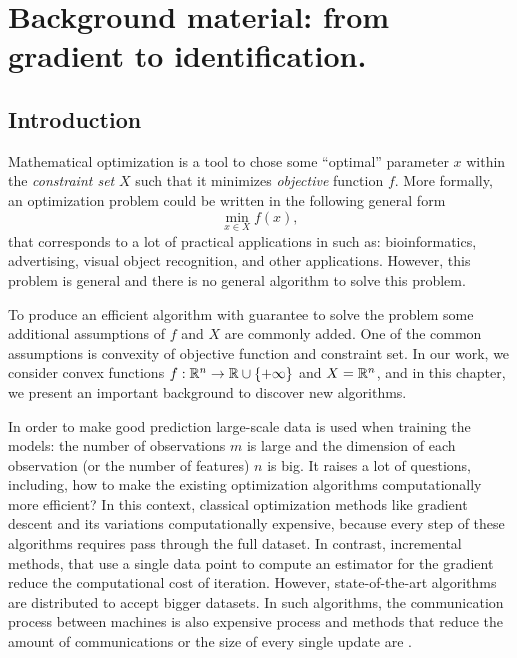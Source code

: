 \chapter[Background material]{Background material: from gradient to identification.}
\label{ch:basics}
\localtableofcontents
\newpage
\section*{Introduction}
Mathematical optimization is a tool to chose some ``optimal'' parameter $x$ within the \emph{constraint set} $X$ such that it minimizes \emph{objective} function $f$. More formally, an optimization problem could be written in the following general form
$$
\min_{x\in X} f(x),
$$
that corresponds to a lot of practical applications in  such as: bioinformatics, advertising, visual object recognition, and other applications. However, this problem is general and there is no general algorithm to solve this problem.

To produce an efficient algorithm with guarantee to solve the problem some additional assumptions of $f$ and $X$ are commonly added. One of the common assumptions is  convexity of objective function and constraint set. In our work, we consider convex functions $f:\mathbb{R}^n\rightarrow \mathbb{R}\cup\{+\infty\}$ and $X = \mathbb{R}^n$, and in this chapter, we present an important background to discover new algorithms.

In order to make good prediction large-scale data is used when training the models: the number of observations $m$ is large and the dimension of each observation (or the number of features) $n$ is big. It raises a lot of questions, including, how to make the existing optimization algorithms computationally more efficient? In this context, classical optimization methods like gradient descent and its variations  computationally expensive, because every step of these algorithms requires  pass through the full dataset. In contrast, incremental methods, that use a single data point  to compute an estimator for the gradient reduce the computational cost of iteration. However,  state-of-the-art algorithms are distributed to accept bigger datasets. In such algorithms, the communication process between machines is also expensive process and methods that  reduce the amount of communications or the size of every single update are .

